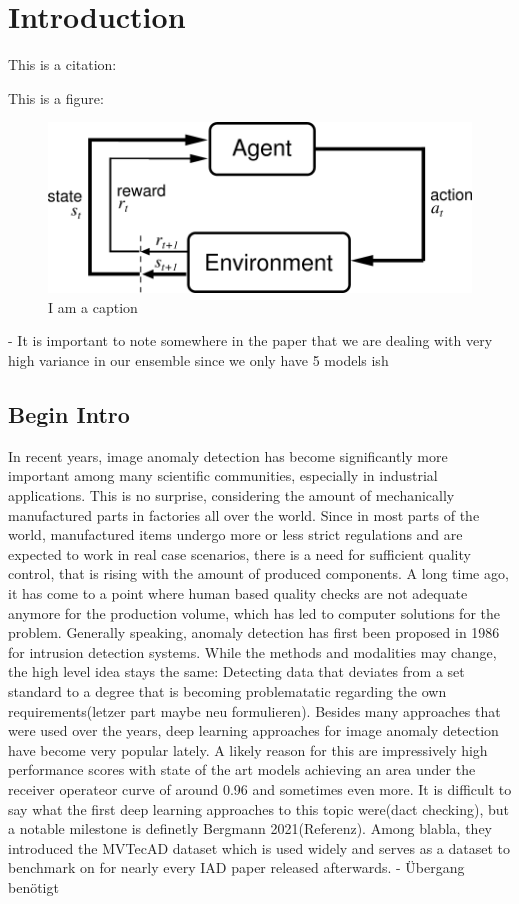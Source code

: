 \chapter{Introduction}
\label{chap:introduction}
This is a citation: \cite{patchCore2022}


This is a figure: 

\begin{figure}[ht]
    \centering
    \includegraphics[width=.5\textwidth]{figures/AgentEnviornment.png}
    \caption{I am a caption}
    \label{fig:my_label}
\end{figure}



- It is important to note somewhere in the paper that we are dealing with very high variance in our ensemble since we only have 5 models ish


\section{Begin Intro}
In recent years, image anomaly detection has become significantly more important among many scientific communities, especially in industrial applications. This is no surprise, considering the
amount of mechanically manufactured parts in factories all over the world. Since in most parts of the world, manufactured items undergo more or less strict regulations and are expected to work
in real case scenarios, there is a need for sufficient quality control, that is rising with the amount of produced components. A long time ago, it has come to a point where human based quality 
checks are not adequate anymore for the production volume, which has led to computer solutions for the problem. Generally speaking, anomaly detection has first been proposed in 1986 for 
intrusion detection systems. While the methods and modalities may change, the high level idea stays the same: Detecting data that deviates from a set standard to a degree that is becoming
problematatic regarding the own requirements(letzer part maybe neu formulieren). Besides many approaches that were used over the years, deep learning approaches for image anomaly detection have
become very popular lately. A likely reason for this are impressively high performance scores with state of the art models achieving an area under the receiver operateor curve of around 0.96 and 
sometimes even more.
It is difficult to say what the first deep learning approaches to this topic were(dact checking), but a notable milestone is definetly Bergmann 2021(Referenz). Among blabla, they introduced
the MVTecAD dataset which is used widely and serves as a dataset to benchmark on for nearly every IAD paper released afterwards. - Übergang benötigt









